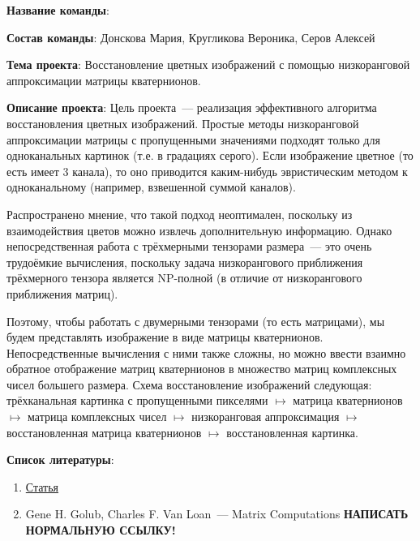 \documentclass[12pt]{article}
\begin{document}
\textbf{Название команды}:


\textbf{Состав команды}:
Донскова Мария, Кругликова Вероника, Серов Алексей


\textbf{Тема проекта}:
Восстановление цветных изображений с помощью низкоранговой аппроксимации матрицы кватернионов.


\textbf{Описание проекта}:
Цель проекта~--- реализация эффективного алгоритма восстановления цветных изображений.
Простые методы низкоранговой аппроксимации матрицы с пропущенными значениями подходят только для одноканальных картинок (т.е. в градациях серого).
Если изображение цветное (то есть имеет 3 канала), то оно приводится каким-нибудь эвристическим методом к одноканальному (например, взвешенной суммой каналов).

Распространено мнение, что такой подход неоптимален, поскольку из взаимодействия цветов можно извлечь дополнительную информацию.
Однако непосредственная работа с трёхмерными тензорами размера~--- это очень трудоёмкие вычисления, поскольку задача низкорангового приближения трёхмерного тензора является NP-полной (в отличие от низкорангового приближения матриц).

Поэтому, чтобы работать с двумерными тензорами (то есть матрицами), мы будем представлять изображение в виде матрицы кватернионов.
Непосредственные вычисления с ними также сложны, но можно ввести взаимно обратное отображение матриц кватернионов в множество матриц комплексных чисел большего размера.
Схема восстановление изображений следующая: трёхканальная картинка с пропущенными пикселями $\mapsto$ матрица кватернионов $\mapsto$ матрица комплексных чисел $\mapsto$ низкоранговая аппроксимация $\mapsto$ восстановленная матрица кватернионов $\mapsto$ восстановленная картинка.  


\textbf{Список литературы}:
    \begin{enumerate}[label=\arabic*)]
	\item
	    \href{https://arxiv.org/abs/1909.06567}{Статья}

	\item
	    Gene H. Golub, Charles F. Van Loan~--- Matrix Computations \textbf{НАПИСАТЬ НОРМАЛЬНУЮ ССЫЛКУ!}
    \end{enumerate}
\end{document}
